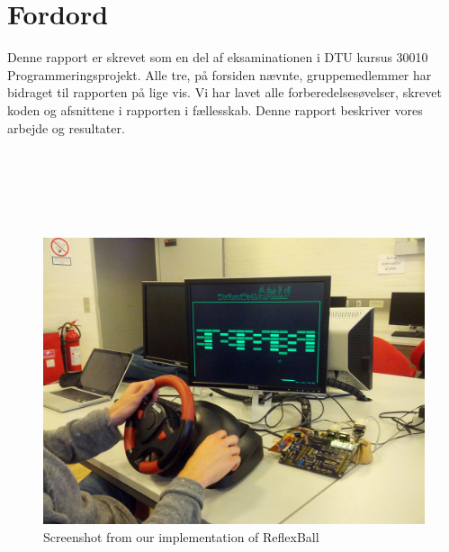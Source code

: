 \chapter{Fordord}

Denne rapport er skrevet som en del af eksaminationen i DTU kursus 30010 Programmeringsprojekt. Alle tre, på forsiden nævnte, gruppemedlemmer har bidraget til rapporten på lige vis. Vi har lavet alle forberedelsesøvelser, skrevet koden og afsnittene i rapporten i fællesskab. Denne rapport beskriver vores arbejde og resultater.\\ \\ \\ \\ \\ \\

\begin{figure}[h!]
\centering
\includegraphics[scale=0.17]{figs/forside.jpg}
\caption{Screenshot from our implementation of ReflexBall}
\label{fig:forside}
\end{figure}